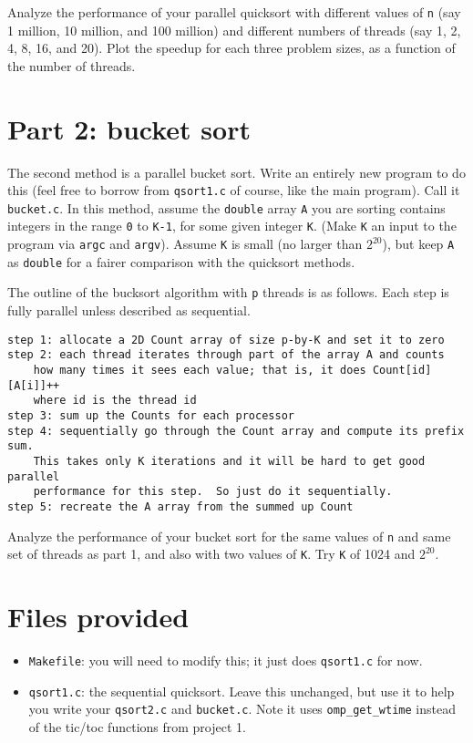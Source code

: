 \documentclass[11pt]{article}
\begin{document}
Analyze the performance of your parallel quicksort with different values of \verb'n'
(say 1 million, 10 million, and 100 million) and different numbers of threads
(say 1, 2, 4, 8, 16, and 20).
Plot the speedup for each three problem sizes, as a function of the number of threads.

\section{Part 2: bucket sort}
The second method is a parallel bucket sort.  Write an entirely new program to do this
(feel free to borrow from \verb'qsort1.c' of course, like the main program).
Call it \verb'bucket.c'.
In this method, assume the \verb'double' array \verb'A' you are sorting contains
integers in the range \verb'0' to \verb'K-1', for some given integer \verb'K'.
(Make \verb'K' an input to the program via \verb'argc' and \verb'argv').
Assume \verb'K' is small (no larger than $2^{20}$), but keep \verb'A' as \verb'double'
for a fairer comparison with the quicksort methods.

The outline of the bucksort algorithm with \verb'p' threads is as follows.
Each step is fully parallel unless described as sequential.

\begin{verbatim}
step 1: allocate a 2D Count array of size p-by-K and set it to zero
step 2: each thread iterates through part of the array A and counts
    how many times it sees each value; that is, it does Count[id][A[i]]++
    where id is the thread id
step 3: sum up the Counts for each processor
step 4: sequentially go through the Count array and compute its prefix sum.
    This takes only K iterations and it will be hard to get good parallel
    performance for this step.  So just do it sequentially.
step 5: recreate the A array from the summed up Count
\end{verbatim}

Analyze the performance of your bucket sort for the same values of \verb'n'
and same set of threads as part 1, and also with two values of \verb'K'.
Try \verb'K' of 1024 and $2^{20}$.

\section{Files provided}

\begin{itemize}
\item \verb'Makefile':  you will need to modify this; it just does \verb'qsort1.c' for now.

\item \verb'qsort1.c': the sequential quicksort.  Leave this unchanged, but use it
to help you write your \verb'qsort2.c' and \verb'bucket.c'.
    Note it uses \verb'omp_get_wtime' instead of the tic/toc functions from project 1.

\end{itemize}
\end{document}
